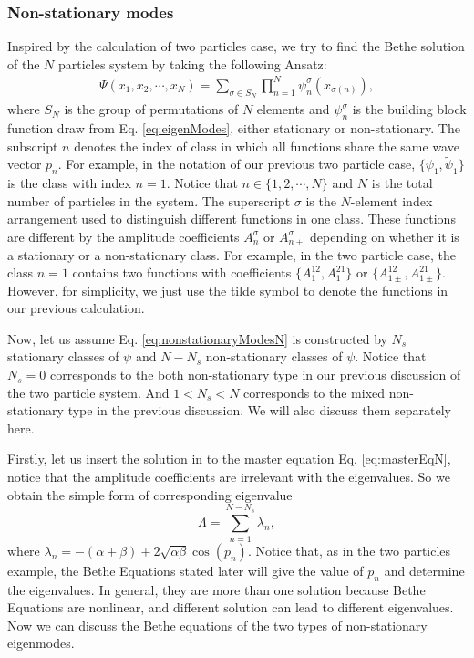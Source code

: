 \subsubsection{Non-stationary modes}
\label{ssub:Non-stationary modes}

Inspired by the calculation of two particles case, we try to find the Bethe solution of the $N$ particles system by taking the following Ansatz: 
\begin{equation}
    \label{eq:nonstationaryModesN}
    \begin{aligned}
        \Psi(x_1, x_2, \cdots, x_N) = \sum_{\sigma\in {S}_N} \prod_{n=1}^N \psi_n^{\sigma}(x_{\sigma(n)}),
    \end{aligned}
\end{equation}
where ${S}_N$ is the group of permutations of $N$ elements and $\psi_n^{\sigma}$ is the building block function draw from  Eq. \eqref{eq:eigenModes}, either stationary or non-stationary. 
The subscript $n$ denotes the index of class in which all functions share the same wave vector $p_n$. For example, in the notation of our previous two particle case, $\{\psi_1,\tilde{\psi}_1\}$ is the class with index $n=1$. Notice that $n\in\{1,2,\cdots, N\}$ and $N$ is the total number of particles in the system. 
The superscript $\sigma$ is the $N$-element index arrangement used to distinguish different functions in one class. These functions are different by the amplitude coefficients $A_n^{\sigma}$ or $A_{n\pm}^{\sigma}$ depending on whether it is a stationary or a non-stationary class. For example, in the two particle case, the class $n=1$ contains two functions with coefficients $\{A_1^{12},A_1^{21}\}$ or $\{A_{1\pm}^{12},A_{1\pm}^{21}\}$. However, for simplicity, we just use the tilde symbol to denote the functions in our previous calculation.

Now, let us assume Eq. \eqref{eq:nonstationaryModesN} is constructed by $N_s$ stationary classes of $\psi$ and $N-N_s$ non-stationary classes of $\psi$. Notice that $N_s=0$ corresponds to the both non-stationary type in our previous discussion of the two particle system. And $1<N_s<N$ corresponds to the mixed non-stationary type in the previous discussion. We will also discuss them separately here.

Firstly, let us insert the solution in to the master equation Eq. \eqref{eq:masterEqN}, notice that the amplitude coefficients are irrelevant with the eigenvalues. So we obtain the simple form of corresponding eigenvalue 
\begin{equation}
    \label{eq:eigenvaluesN}
    \Lambda = \sum_{n=1}^{N-N_s} \lambda_n,
\end{equation}
where $\lambda_n = -(\alpha+\beta)+2\sqrt{\alpha\beta}\cos(p_n)$.  Notice that, as in the two particles example, the Bethe Equations stated later will give the value of $p_n$ and determine the eigenvalues. In general, they are more than one solution because Bethe Equations are nonlinear, and different solution can lead to different eigenvalues.
Now we can discuss the Bethe equations of the two types of non-stationary eigenmodes. 

